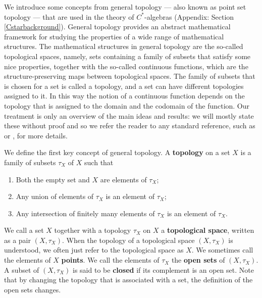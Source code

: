 \documentclass{article}
\theoremstyle{plain}
\theoremstyle{definition}
\theoremstyle{remark}
\begin{document}
We introduce some concepts 
from general topology --- also known as point set topology ---
that are used in the theory of $C^{*}$-algebras (Appendix: Section \ref{Cstarbackground}).
General topology provides an abstract mathematical framework
for studying the properties of a wide range of mathematical structures.
The mathematical structures in general topology are 
the so-called topological spaces, namely, sets
containing a family of subsets that satisfy some nice properties,
together with the so-called continuous functions,
which are the structure-preserving maps between topological spaces.
The family of subsets that is chosen for a set is called a topology, and
a set can have different topologies assigned to it.
In this way the notion of a continuous function depends on the topology that
is assigned to the domain and the codomain of the function.
Our treatment is only an overview of the main ideas and results:
we will mostly state these without proof and so we refer the reader to 
any standard reference, such as 
\citet{Bourbaki1995} or \citet{Munkres2018},
for more details.

We define the first key concept of general topology.
A \textbf{topology} on a set $X$ is a family of subsets $\tau_X$ of $X$ such that
\begin{enumerate}
	\item Both the empty set and $X$ are elements of $\tau_X$;
	\item Any union of elements of $\tau_X$ is an element of $\tau_X$;
	\item Any intersection of finitely many elements of $\tau_X$ is an element of $\tau_X$.
\end{enumerate}
We call a set $X$ together with a topology $\tau_X$ on $X$ a \textbf{topological space},
written as a pair $(X, \tau_X)$.
When the topology of a topological space $(X, \tau_X)$ is understood, 
we often just refer to the topological space as $X$.
We sometimes call the elements of $X$ \textbf{points}.
We call the elements of $\tau_X$ the \textbf{open sets} of $(X, \tau_X)$.
A subset of $(X, \tau_X)$ is said to be \textbf{closed} 
if its complement is an open set.
Note that by changing the topology that is associated with a set, 
the definition of the open sets changes.
\end{document}
